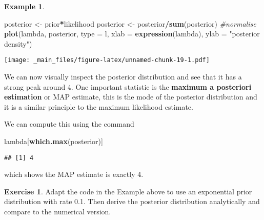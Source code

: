 \documentclass[
]{book}
\newenvironment{Shaded}{\begin{snugshade}}{\end{snugshade}}
\newcommand{\AttributeTok}[1]{\textcolor[rgb]{0.13,0.29,0.53}{#1}}
\newcommand{\CommentTok}[1]{\textcolor[rgb]{0.56,0.35,0.01}{\textit{#1}}}
\newcommand{\FunctionTok}[1]{\textcolor[rgb]{0.13,0.29,0.53}{\textbf{#1}}}
\newcommand{\NormalTok}[1]{#1}
\newcommand{\OtherTok}[1]{\textcolor[rgb]{0.56,0.35,0.01}{#1}}
\newcommand{\SpecialCharTok}[1]{\textcolor[rgb]{0.81,0.36,0.00}{\textbf{#1}}}
\newcommand{\StringTok}[1]{\textcolor[rgb]{0.31,0.60,0.02}{#1}}
\theoremstyle{definition}
\theoremstyle{definition}
\newtheorem{example}{Example}[chapter]
\theoremstyle{definition}
\newtheorem{exercise}{Exercise}[chapter]
\theoremstyle{definition}
\theoremstyle{remark}
\begin{document}
\begin{example}
\begin{Shaded}
\begin{Highlighting}[]
\NormalTok{posterior }\OtherTok{\textless{}{-}}\NormalTok{ prior}\SpecialCharTok{*}\NormalTok{likelihood}
\NormalTok{posterior }\OtherTok{\textless{}{-}}\NormalTok{ posterior}\SpecialCharTok{/}\FunctionTok{sum}\NormalTok{(posterior) }\CommentTok{\#normalise}
\FunctionTok{plot}\NormalTok{(lambda, posterior, }\AttributeTok{type =} \StringTok{\textquotesingle{}l\textquotesingle{}}\NormalTok{, }\AttributeTok{xlab =} \FunctionTok{expression}\NormalTok{(lambda), }
     \AttributeTok{ylab =} \StringTok{"posterior density"}\NormalTok{)}
\end{Highlighting}
\end{Shaded}

\texttt{[image: \_main\_files/figure-latex/unnamed-chunk-19-1.pdf]}

We can now visually inspect the posterior distribution and see that it has a strong peak around 4. One important statistic is the \textbf{maximum a posteriori estimation} or MAP estimate, this is the mode of the posterior distribution and it is a similar principle to the maximum likelihood estimate.

We can compute this using the command

\begin{Shaded}
\begin{Highlighting}[]
\NormalTok{lambda[}\FunctionTok{which.max}\NormalTok{(posterior)]}
\end{Highlighting}
\end{Shaded}

\begin{verbatim}
## [1] 4
\end{verbatim}

which shows the MAP estimate is exactly 4.
\end{example}

\begin{exercise}
Adapt the code in the Example above to use an exponential prior distribution with rate 0.1. Then derive the posterior distribution analytically and compare to the numerical version.
\end{exercise}
\end{document}
